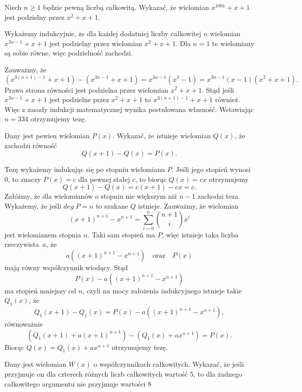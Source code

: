 \begin{problem}{3}
    Niech $n \geqslant 1$ będzie pewną liczbą całkowitą. Wykazać, że wielomian $x^{1001} + x + 1$ jest podzielny przez $x^2 + x + 1$.
\end{problem}

\noindent
Wykażemy indukcyjnie, że dla każdej dodatniej liczby całkowitej $n$ wielomian $x^{3n - 1} + x + 1$ jest podzielny przez wielomian $x^2 + x + 1$. Dla $n = 1$ te wielomiany są sobie równe, więc podzielność zachodzi.
 
\vspace{10 px}
\noindent
Zauważmy, że
\[
    (x^{3(n + 1) - 1} + x + 1) - (x^{3n - 1} + x + 1) = x^{3n - 1}(x^3 - 1) =   x^{3n - 1}(x - 1)(x^2 + x + 1).
\]
Prawa strona równości jest podzielna przez wielomian $x^2 + x + 1$. Stąd jeśli $x^{3n - 1} + x + 1$ jest podzielne przez $x^2 + x + 1$ to $x^{3(n + 1) - 1} + x + 1$ również. Więc z zasady indukcji matematycznej wynika postulowana własność. Wstawiając $n = 334$ otrzymujemy tezę.


\begin{problem}{4}
    Dany jest pewien wielomian $P(x)$. Wykazać, że istnieje wielomian $Q(x)$, że zachodzi równość
    \[
        Q(x + 1) - Q(x) = P(x).
    \]
\end{problem}

\noindent
Tezę wykażemy indukując się po stopniu wielomianu $P$. Jeśli jego stopień wynosi $0$, to znaczy $P(x) = c$ dla pewnej stałej $c$, to biorąc $Q(x) = cx$ otrzymujemy
\[
    Q(x + 1) - Q(x) = c(x + 1) - cx = c.
\]
Załóżmy, że dla wielomianów o stopniu nie większym niż $n - 1$ zachodzi teza. Wykażemy, że jeśli ${deg\; P = n}$ to szukane $Q$ istnieje.
Zauważmy, że wielomian 
\[
    (x + 1)^{n + 1} - x^{n + 1} = \sum^{n}_{i = 0} {{n + 1}\choose{i}}x^i
\]
jest wielomianem stopnia $n$. Taki sam stopień ma $P$, więc istnieje taka liczba rzeczywista~$a$, że
\[
    a\left((x + 1)^{n + 1} - x^{n + 1} \right) \quad \text{oraz} \quad P(x)
\]
mają równy współczynnik wiodący. Stąd
\[
    P(x) - a\left((x + 1)^{n + 1} - x^{n + 1} \right)
\]
ma stopień mniejszy od $n$, czyli na mocy założenia indukcyjnego istnieje takie $Q_1(x)$, że
\[
    Q_1(x + 1) - Q_1(x) = P(x) - a\left((x + 1)^{n + 1} - x^{n + 1} \right),
\]
równoważnie
\[
    (Q_1(x + 1) + a(x + 1)^{n + 1}) - (Q_1(x) + ax^{n + 1}) = P(x).
\]
Biorąc $Q(x) = Q_1(x) + ax^{n + 1}$ otrzymujemy tezę.

\begin{problem}{5}
    Dany jest wielomian $W(x)$ o współczynnikach całkowitych. Wykazać, że jeśli przyjmuje on dla czterech różnych liczb całkowitych wartość $5$, to dla żadnego całkowitego argumentu nie przyjmuje wartości $8$
\end{problem}

